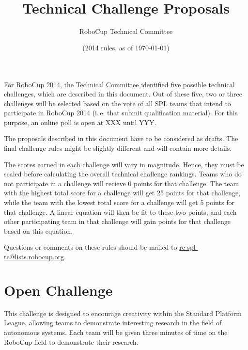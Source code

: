\documentclass[12pt]{article}
\title{\leaguename \\ Technical Challenge Proposals}
\author{RoboCup Technical Committee}
\date{(2014 rules, as of \today)}
\newcommand{\ie}{\mbox{i.\,e.}\xspace}
\begin{document}
\maketitle

For RoboCup 2014, the Technical Committee identified five possible technical challenges, which are described in this document. Out of these five, two or three challenges will be selected based on the vote of all SPL teams that intend to participate in RoboCup 2014 (\ie that submit qualification material). For this purpose, an online poll is open at  XXX until  YYY.

The proposals described in this document have to be considered as drafts. The final challenge rules might be slightly different and will contain more details.

The scores earned in each challenge will vary in magnitude.  Hence, they must be scaled before calculating the overall technical challenge rankings.  Teams who do not participate in a challenge will recieve 0 points for that challenge.  The team with the highest total score for a challenge will get 25 points for that challenge, while the team with the lowest total score for a challenge will get 5 points for that challenge.  A linear equation will then be fit to these two points, and each other participating team in that challenge will gain points for that challenge based on this equation.

Questions or comments on these rules should be mailed to {\small \url{rc-spl-tc@lists.robocup.org}}.

\vfill

\renewcommand\contentsname{Challenges}
\tableofcontents
\setcounter{tocdepth}{1}

\thispagestyle{fancy}

\clearpage

\cfoot{\thepage}
\setcounter{page}{1}






\section{Open Challenge}
\newcommand{\openMinNum}{three}

This challenge is designed to encourage creativity within the Standard 
Platform League, allowing teams to demonstrate interesting research in 
the field of autonomous systems. Each team will be given \openMinNum{} 
minutes of time on the RoboCup field to demonstrate their research.
\end{document}
